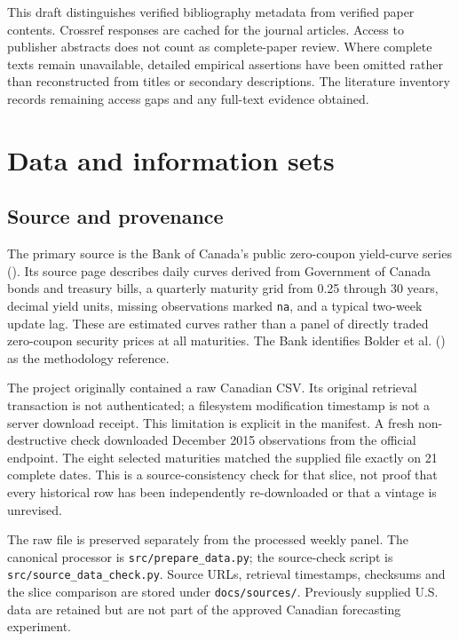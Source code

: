 \documentclass[
  12pt,
  letterpaper,
  DIV=11,
  numbers=noendperiod]{scrreprt}
\begin{document}
This draft distinguishes verified bibliography metadata from verified
paper contents. Crossref responses are cached for the journal articles.
Access to publisher abstracts does not count as complete-paper review.
Where complete texts remain unavailable, detailed empirical assertions
have been omitted rather than reconstructed from titles or secondary
descriptions. The literature inventory records remaining access gaps and
any full-text evidence obtained.

\chapter{Data and information sets}\label{sec-data}

\section{Source and provenance}\label{source-and-provenance}

The primary source is the Bank of Canada's public zero-coupon
yield-curve series (). Its
source page describes daily curves derived from Government of Canada
bonds and treasury bills, a quarterly maturity grid from 0.25 through 30
years, decimal yield units, missing observations marked \texttt{na}, and
a typical two-week update lag. These are estimated curves rather than a
panel of directly traded zero-coupon security prices at all maturities.
The Bank identifies Bolder et al.
() as the methodology reference.

The project originally contained a raw Canadian CSV. Its original
retrieval transaction is not authenticated; a filesystem modification
timestamp is not a server download receipt. This limitation is explicit
in the manifest. A fresh non-destructive check downloaded December 2015
observations from the official endpoint. The eight selected maturities
matched the supplied file exactly on 21 complete dates. This is a
source-consistency check for that slice, not proof that every historical
row has been independently re-downloaded or that a vintage is unrevised.

The raw file is preserved separately from the processed weekly panel.
The canonical processor is \texttt{src/prepare\_data.py}; the
source-check script is \texttt{src/source\_data\_check.py}. Source URLs,
retrieval timestamps, checksums and the slice comparison are stored
under \texttt{docs/sources/}. Previously supplied U.S. data are retained
but are not part of the approved Canadian forecasting experiment.
\end{document}
